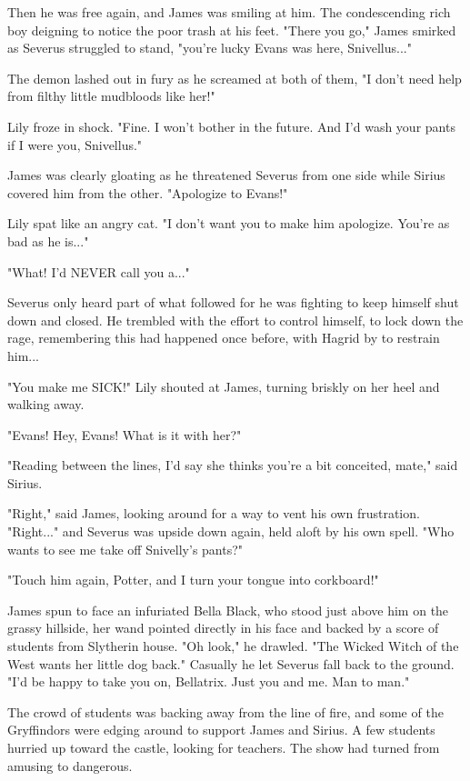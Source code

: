 \documentclass[a4paper,11pt]{article}
\begin{document}
Then he was free again, and James was smiling at him. The condescending rich boy deigning to notice the poor trash at his feet. "There you go," James smirked as Severus struggled to stand, "you're lucky Evans was here, Snivellus..."

The demon lashed out in fury as he screamed at both of them, "I don't need help from filthy little mudbloods like her!"

Lily froze in shock. "Fine. I won't bother in the future. And I'd wash your pants if I were you, Snivellus."

James was clearly gloating as he threatened Severus from one side while Sirius covered him from the other. "Apologize to Evans!"

Lily spat like an angry cat. "I don't want you to make him apologize. You're as bad as he is..."

"What! I'd NEVER call you a..."

Severus only heard part of what followed for he was fighting to keep himself shut down and closed. He trembled with the effort to control himself, to lock down the rage, remembering this had happened once before, with Hagrid by to restrain him...

"You make me SICK!" Lily shouted at James, turning briskly on her heel and walking away.

"Evans! Hey, Evans! What is it with her?"

"Reading between the lines, I'd say she thinks you're a bit conceited, mate," said Sirius.

"Right," said James, looking around for a way to vent his own frustration. "Right..." and Severus was upside down again, held aloft by his own spell. "Who wants to see me take off Snivelly's pants?"

"Touch him again, Potter, and I turn your tongue into corkboard!"

James spun to face an infuriated Bella Black, who stood just above him on the grassy hillside, her wand pointed directly in his face and backed by a score of students from Slytherin house. "Oh look," he drawled. "The Wicked Witch of the West wants her little dog back." Casually he let Severus fall back to the ground. "I'd be happy to take you on, Bellatrix. Just you and me. Man to man."

The crowd of students was backing away from the line of fire, and some of the Gryffindors were edging around to support James and Sirius. A few students hurried up toward the castle, looking for teachers. The show had turned from amusing to dangerous.
\end{document}

